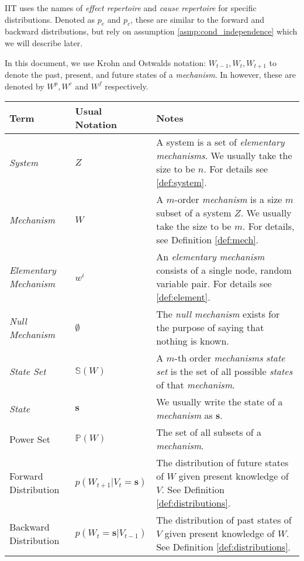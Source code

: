 \begin{definition}
	{IIT \cite{oizumi2014phenomenology} uses the names of \textit{effect repertoire} and \textit{cause repertoire} for specific distributions. Denoted as $p_e$ and $p_c$, these are similar to the forward and backward distributions, but rely on assumption \ref{asmp:cond_independence} which we will describe later. }
\end{definition}


\begin{remark}
	In this document, we use Krohn and Ostwalds  \cite{krohn2016computing} notation: $W_{t-1}, W_t, W_{t+1}$ to denote the past, present, and future states of a \textit{mechanism}. In \cite{oizumi2014phenomenology} however, these are denoted by $W^p, W^c$ and $W^f$ respectively.
\end{remark}

\begin{tabularx}{\textwidth}{ll X}
	Term & Usual Notation & Notes \\
	\hline
	\endfirsthead
	\hline
	\endhead
	\endfoot
	\hline
	\caption{Key Definitions and Notation} 
	\label{tab:defs}
	\endlastfoot
	\textit{System} & $Z$ & A system is a set of \textit{elementary mechanisms}. We usually take the size to be $n$. For details see \ref{def:system}.\\
		\hline
	\textit{Mechanism} & $W$ & A $m$-order \textit{mechanism} is a size $m$  subset of a system $Z$. We usually take the size to be $m$. For details, see Definition \ref{def:mech}. \\
		\hline
	\textit{Elementary Mechanism} & $w^i$ & An \textit{elementary mechanism} consists of a single node, random variable pair. For details see \ref{def:element}.\\
		\hline
	\textit{Null Mechanism} & $\emptyset$ & The \textit{null mechanism} exists for the purpose of saying that nothing is known.\\
		\hline
	\textit{State Set} & $\mathbb{S}(W)$ & A $m$-th order \textit{mechanisms} \textit{state set} is the set of all possible \textit{states} of that \textit{mechanism}. \\
		\hline
	\textit{State} & $\mathbf{s}$ & We usually write the state of a \textit{mechanism} as $\mathbf{s}$.\\
		\hline
	Power Set & $\mathbb{P}(W)$ & The set of all subsets of a \textit{mechanism}.\\
		\hline
	Forward Distribution & $p(W_{t+1}|V_t=\mathbf{s})$ &The distribution of future states of $W$ given present knowledge of $V$. See Definition \ref{def:distributions}. \\
		\hline
	Backward Distribution & $p(W_{t}=\mathbf{s}|V_{t-1})$ & The distribution of past states of $V$ given present knowledge of $W$. See Definition \ref{def:distributions}.\\
\end{tabularx}









